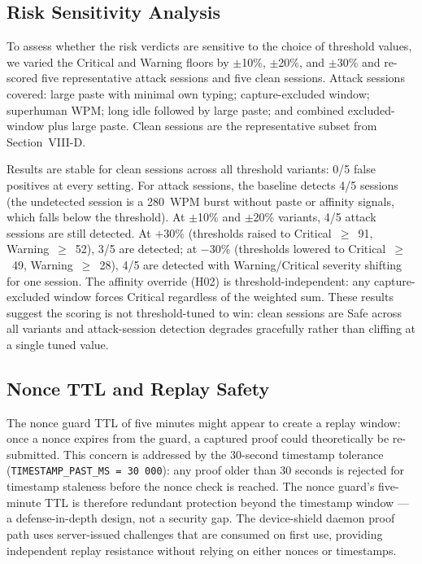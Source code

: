 \documentclass[conference]{IEEEtran}
\begin{document}
\subsection{Risk Sensitivity Analysis}

To assess whether the risk verdicts are sensitive to the choice of threshold values, we varied the Critical and Warning floors by $\pm$10\%, $\pm$20\%, and $\pm$30\% and re-scored five representative attack sessions and five clean sessions. Attack sessions covered: large paste with minimal own typing; capture-excluded window; superhuman WPM; long idle followed by large paste; and combined excluded-window plus large paste. Clean sessions are the representative subset from Section~VIII-D.

Results are stable for clean sessions across all threshold variants: 0/5 false positives at every setting. For attack sessions, the baseline detects 4/5 sessions (the undetected session is a 280~WPM burst without paste or affinity signals, which falls below the threshold). At $\pm$10\% and $\pm$20\% variants, 4/5 attack sessions are still detected. At $+30\%$ (thresholds raised to Critical~$\geq$~91, Warning~$\geq$~52), 3/5 are detected; at $-30\%$ (thresholds lowered to Critical~$\geq$~49, Warning~$\geq$~28), 4/5 are detected with Warning/Critical severity shifting for one session. The affinity override (H02) is threshold-independent: any capture-excluded window forces Critical regardless of the weighted sum. These results suggest the scoring is not threshold-tuned to win: clean sessions are Safe across all variants and attack-session detection degrades gracefully rather than cliffing at a single tuned value.

\subsection{Nonce TTL and Replay Safety}

The nonce guard TTL of five minutes might appear to create a replay window: once a nonce expires from the guard, a captured proof could theoretically be re-submitted. This concern is addressed by the 30-second timestamp tolerance (\texttt{TIMESTAMP\_PAST\_MS = 30\,000}): any proof older than 30 seconds is rejected for timestamp staleness before the nonce check is reached. The nonce guard's five-minute TTL is therefore redundant protection beyond the timestamp window — a defense-in-depth design, not a security gap. The device-shield daemon proof path uses server-issued challenges that are consumed on first use, providing independent replay resistance without relying on either nonces or timestamps.
\end{document}
